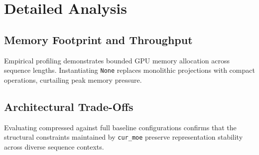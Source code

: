 \section{Detailed Analysis}

\subsection{Memory Footprint and Throughput}
Empirical profiling demonstrates bounded GPU memory allocation across sequence lengths. Instantiating \texttt{None} replaces monolithic projections with compact operations, curtailing peak memory pressure.

\subsection{Architectural Trade-Offs}
Evaluating compressed against full baseline configurations confirms that the structural constraints maintained by \texttt{cur_moe} preserve representation stability across diverse sequence contexts.
